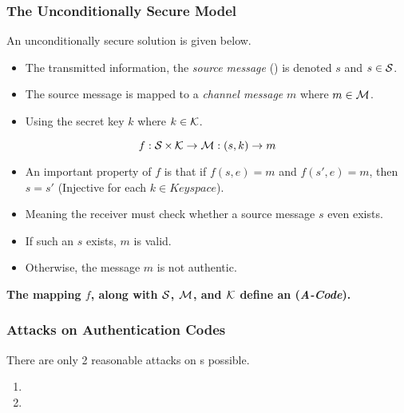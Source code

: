 \subsubsection{The Unconditionally Secure Model}\label{subsubsec:Authentication_Code_Unconditionally_Secure_Model}
An unconditionally secure solution is given below.
\begin{itemize}[noitemsep]
\item The transmitted information, the \emph{source message} () is denoted $s$ and $s \in \operatorname{\mathcal{S}}$.
\item The source message is mapped to a \emph{channel message} $m$ where $m \in \operatorname{\mathcal{M}}$.
\item Using the secret key $k$ where $k \in \operatorname{\mathcal{K}}$.
\end{itemize}

\begin{equation}\label{eq:Unconditional_Authentication_Code}
  f : \operatorname{\mathcal{S}} \times \operatorname{\mathcal{K}} \to \mathcal{M} : (s, k) \to m
\end{equation}
\begin{itemize}[noitemsep]
\item An important property of $f$ is that if $f(s, e) = m$ and $f(s', e) = m$, then $s = s'$ (Injective for each $k \in Keyspace$).
\item Meaning the receiver must check whether a source message $s$ even exists.
\item If such an $s$ exists, $m$ is valid.
\item Otherwise, the message $m$ is not authentic.
\end{itemize}

\begin{large}
  \textbf{The mapping $f$, along with $\operatorname{\mathcal{S}}$, $\operatorname{\mathcal{M}}$, and $\operatorname{\mathcal{K}}$ define an  (\emph{A-Code}).}
\end{large}

\subsubsection{Attacks on Authentication Codes}\label{subsubsec:Attacks_Authentication_Codes}
There are only 2 reasonable attacks on s possible.
\begin{enumerate}[noitemsep]
\item {}
\item {}
\end{enumerate}

